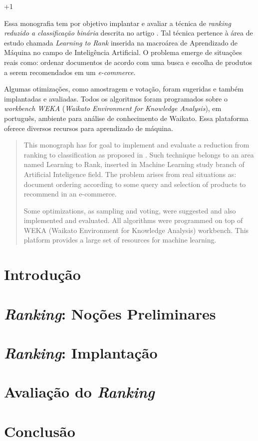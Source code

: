 \documentclass[12pt, a4paper, normaltoc, capchap, capsec, times]{abnt}
\begin{document}
\looseness+1

\begin{resumo}
Essa monografia tem por objetivo implantar e avaliar a técnica de \emph{ranking reduzido a classificação binária} descrita no artigo \cite{langford08}. Tal técnica pertence à área de estudo chamada \emph{Learning to Rank} inserida na macroárea de Aprendizado de Máquina no campo de Inteligência Artificial. O problema emerge de situações reais como: ordenar documentos de acordo com uma busca e escolha de produtos a serem recomendados em um \emph{e-commerce}.

Algumas otimizações, como amostragem e votação, foram sugeridas e também implantadas e avaliadas. Todos os algoritmos foram programados sobre o \emph{workbench WEKA} (\emph{Waikato Environment for Knowledge Analysis}), em português, ambiente para análise de conhecimento de Waikato. Essa plataforma oferece diversos recursos para aprendizado de máquina.
\end{resumo}

\begin{abstract}
This monograph has for goal to implement and evaluate a reduction from ranking to classification as proposed in \cite{langford08}. Such technique belongs to an area named Learning to Rank, inserted in Machine Learning study branch of Artificial Inteligence field. The problem arises from real situations as: document ordering according to some query and selection of products to recommend in an e-commerce.

Some optimizations, as sampling and voting, were suggested and also implemented and evaluated. All algorithms were programmed on top of WEKA (Waikato Environment for Knowledge Analysis) workbench. This platform provides a large set of resources for machine learning.
\end{abstract}

\chapter{Introdução}
\label{chap:introducao}


\chapter{\emph{Ranking}: Noções Preliminares}
\label{chap:nocoes_preliminares}


\chapter{\emph{Ranking}: Implantação}
\label{chap:implantacao}


\chapter{Avaliação do \emph{Ranking}}
\label{chap:avaliacao}


\chapter{Conclusão}
\label{chap:conclusao}



\end{document}

